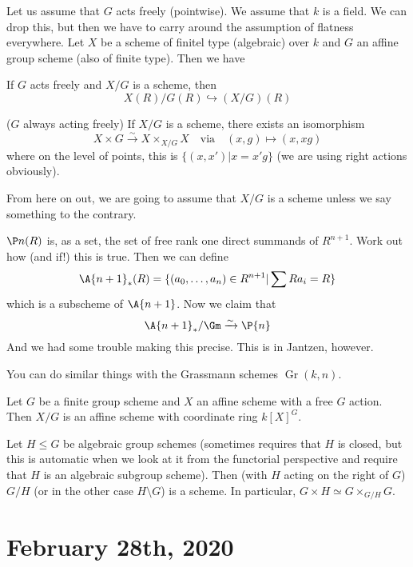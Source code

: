 \documentclass[12pt]{article}
\begin{document}
Let us assume that $G$ acts freely (pointwise). We assume that $k$ is a field. We can drop this, but then we have 
to carry around the assumption of flatness everywhere. Let $X$ be a scheme of finitel type (algebraic) over $k$ and $G$ an 
affine group scheme (also of finite type). Then we have 
\begin{prop}
	If $G$ acts freely and $X/G$ is a scheme, then 
	\[X(R)/G(R)\hookrightarrow (X/G)(R)\]
\end{prop}
\begin{prop}
	($G$ always acting freely) If $X/G$ is a scheme, there exists an isomorphism 
	\[X\times G\xrightarrow{\sim}X\times_{X/G}X\quad\text{via}\quad (x,g)\mapsto (x,xg)\]
	where on the level of points, this is $\{(x,x')|x=x'g\}$ (we are using right actions obviously).
\end{prop}
From here on out, we are going to assume that $X/G$ is a scheme unless we say something to the contrary.
\begin{ex}
	$\P n(R)$ is, as a set, the set of free rank one direct summands of $R^{n+1}$. Work out how (and if!) this is true.
	Then we can define 
	\[\A{n+1}_\ast(R)=\{(a_0,\dots,a_n)\in R^{n+1}|\sum Ra_i=R\}\]
	which is a subscheme of $\A{n+1}$. Now we claim that 
	\[\A{n+1}_\ast/\Gm\xrightarrow{\sim}\P{n}\]
	And we had some trouble making this precise. This is in Jantzen, however.
\end{ex}
You can do similar things with the Grassmann schemes $\operatorname{Gr}(k,n)$.
\begin{thm}
	Let $G$ be a finite group scheme and $X$ an affine scheme with a free $G$ action. Then $X/G$ is an affine scheme with 
	coordinate ring $k[X]^G$.
\end{thm}
\begin{thm}
	Let $H\le G$ be algebraic group schemes (sometimes requires that $H$ is closed, but this is automatic when we look at it from the functorial 
	perspective and require that $H$ is an algebraic subgroup scheme). Then (with $H$ acting on the right of $G$) $G/H$ (or in the other case $H\setminus G$) is a scheme.
	In particular, $G\times H\simeq G\times_{G/H}G$.
\end{thm}

\section{February 28th, 2020}
\end{document}
